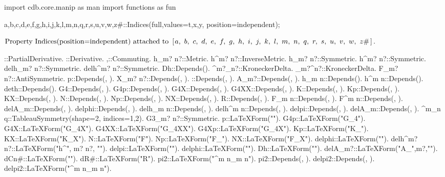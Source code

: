 \documentclass[10pt]{article}
\newcommand\brwrap[3]{%
  \setbox0=\hbox{$#2$}
  \left#1\vbox to \the\ht0{\hbox to 0pt{}}\right.\kern-.2em
  \begingroup #2\endgroup\kern-.15em
  \left.\vbox to \the\ht0{\hbox to 0pt{}}\right#3
}
\begin{document}
\begin{python}
import cdb.core.manip as man
import functions as fun
\end{python}
\begin{python}
{a,b,c,d,e,f,g,h,i,j,k,l,m,n,q,r,s,u,v,w,z#}::Indices(full,values={t,x,y}, position=independent);
\end{python}
\begin{adjustwidth}{1em}{0cm}${}\text{Property Indices(position=independent) attached to~}\brwrap{[}{a,~\discretionary{}{}{} b,~\discretionary{}{}{} c,~\discretionary{}{}{} d,~\discretionary{}{}{} e,~\discretionary{}{}{} f,~\discretionary{}{}{} g,~\discretionary{}{}{} h,~\discretionary{}{}{} i,~\discretionary{}{}{} j,~\discretionary{}{}{} k,~\discretionary{}{}{} l,~\discretionary{}{}{} m,~\discretionary{}{}{} n,~\discretionary{}{}{} q,~\discretionary{}{}{} r,~\discretionary{}{}{} s,~\discretionary{}{}{} u,~\discretionary{}{}{} v,~\discretionary{}{}{} w,~\discretionary{}{}{} z\#}{]}.$\end{adjustwidth}
\begin{python}
\partial{#}::PartialDerivative.
\nabla{#}::Derivative.
{\nabla{#},\partial{#}}::Commuting.
h_{m? n?}::Metric.
h^{m? n?}::InverseMetric.
h_{m? n?}::Symmetric.
h^{m? n?}::Symmetric.
delh_{m? n?}::Symmetric.
delh^{m? n?}::Symmetric.
Dh::Depends(\partial{#}).
\delta^{m?}_{n?}::KroneckerDelta.
\delta_{m?}^{n?}::KroneckerDelta.
F_{m? n?}::AntiSymmetric.
p::Depends(\nabla{#}, \partial{#}).
X_{m? n?}::Depends(\nabla{#}, \partial{#}).
\phi::Depends(\nabla{#}, \partial{#}).
A_{m?}::Depends(\nabla{#}, \partial{#}).
h_{m n}::Depends(\partial{#}).
h^{m n}::Depends(\partial{#}).
deth::Depends(\partial{#}).
G4::Depends(\nabla{#}, \partial{#}).
G4p::Depends(\nabla{#}, \partial{#}).
G4X::Depends(\nabla{#}, \partial{#}).
G4XX::Depends(\nabla{#}, \partial{#}).
K::Depends(\nabla{#}, \partial{#}).
Kp::Depends(\nabla{#}, \partial{#}).
KX::Depends(\nabla{#}, \partial{#}).
N::Depends(\nabla{#}, \partial{#}).
Np::Depends(\nabla{#}, \partial{#}).
NX::Depends(\nabla{#}, \partial{#}).
R::Depends(\nabla{#}, \partial{#}).
F_{m n}::Depends(\nabla{#}, \partial{#}).
F^{m n}::Depends(\nabla{#}, \partial{#}).
delA_{m}::Depends(\nabla{#}, \partial{#}).
delphi::Depends(\nabla{#}, \partial{#}).
delh_{m n}::Depends(\nabla{#}, \partial{#}).
delh^{m n}::Depends(\nabla{#}, \partial{#}).
delpi::Depends(\nabla{#}, \partial{#}).
delA_{m}::Depends(\nabla{#}, \partial{#}).
\Gamma^{m}_{n q}::TableauSymmetry(shape={2}, indices={1,2}).
G3_{m? n?}::Symmetric.
p::LaTeXForm("\pi").
G4p::LaTeXForm("G_{4\pi}").
G4X::LaTeXForm("G_{4X}").
G4XX::LaTeXForm("G_{4XX}").
G4Xp::LaTeXForm("G_{4\pi X}").
Kp::LaTeXForm("K_{\pi}").
KX::LaTeXForm("K_{X}").
N::LaTeXForm("F").
Np::LaTeXForm("F_{\pi}").
NX::LaTeXForm("F_{X}").
delphi::LaTeXForm("\delta\phi").
delh^{m? n?}::LaTeXForm("\delta h^{", m? n?, "}").
delpi::LaTeXForm("\delta\pi").
delphi::LaTeXForm("\delta\phi").
Dh::LaTeXForm("").
delA_{m?}::LaTeXForm("\delta A_{",m?,"}").
dCn{#}::LaTeXForm("\delta\Gamma").         
dR{#}::LaTeXForm("\delta R").	
pi2::LaTeXForm("\pi^{m n}\pi_{m n}").	
pi2::Depends(\nabla{#}, \partial{#}).
delpi2::Depends(\nabla{#}, \partial{#}).
delpi2::LaTeXForm("\delta\pi^{m n}\pi_{m n}").
\end{python}
\end{document}
